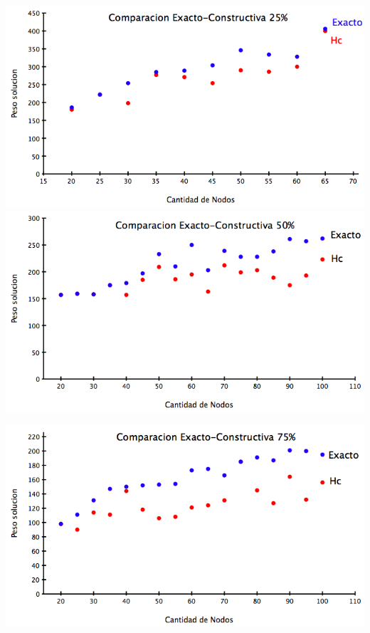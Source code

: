 \documentclass[a4paper, 10pt]{article}
\begin{document}
\vspace*{2em}
\begin{center}
	\includegraphics[scale=0.35,angle=00]{Graficos/04-02.png}
	\includegraphics[scale=0.35,angle=00]{Graficos/04-03.png}
\end{center}

\vspace*{2em}

\begin{center}
	\includegraphics[scale=0.35,angle=00]{Graficos/04-04.png}
\end{center}
\end{document}
